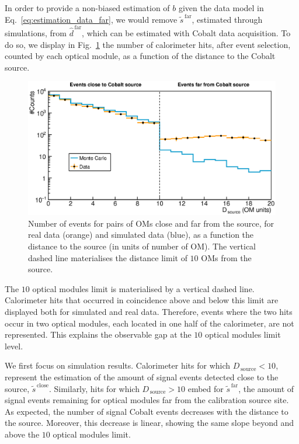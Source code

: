 In order to provide a non-biased estimation of $b$ given the data model in Eq.~\eqref{eq:estimation_data_far}, we would remove $\tilde{s}^{\,\text{far}}$, estimated through simulations, from $\hat{d}^{\,\text{far}}$, which can be estimated with Cobalt data acquisition.
To do so, we display in Fig.~\ref{fig:Co_data_bkg} the number of calorimeter hits, after event selection, counted by each optical module, as a function of the distance to the Cobalt source.
\begin{figure}[h]
  \centering
  \includegraphics[width=1.1\textwidth]{commissioning/fig_commissioning/Co_data_bkg.eps}
  \caption{Number of events for pairs of OMs close and far from the source, for real data (orange) and simulated data (blue), as a function the distance to the source (in units of number of OM).
    The vertical dashed line materialises the distance limit of $10$ OMs from the source.
    \label{fig:Co_data_bkg}}
\end{figure}
The $10$ optical modules limit is materialised by a vertical dashed line.
Calorimeter hits that occurred in coincidence above and below this limit are displayed both for simulated and real data.
Therefore, events where the two hits occur in two optical modules, each located in one half of the calorimeter, are not represented.
This explains the observable gap at the $10$ optical modules limit level.

We first focus on simulation results.
Calorimeter hits for which $D_{\,\text{source}}<10$, represent the estimation of the amount of signal events detected close to the source, $\tilde{s}^{\,\text{close}}$.
Similarly, hits for which $D_{\,\text{source}}>10$ embed for $\tilde{s}^{\,\text{far}}$, the amount of signal events remaining for optical modules far from the calibration source site.
As expected, the number of signal Cobalt events decreases with the distance to the source.
Moreover, this decrease is linear, showing the same slope beyond and above the $10$ optical modules limit.


